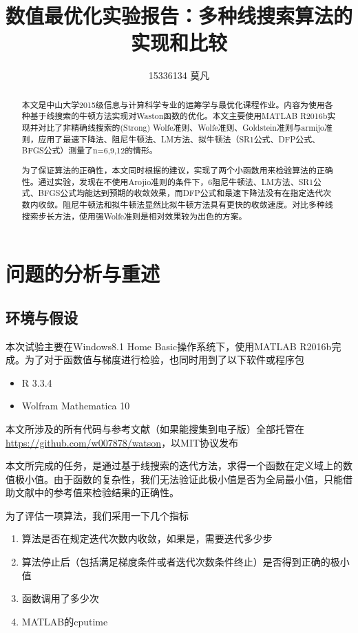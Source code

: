 \documentclass[11pt, a4paper]{article}
\begin{document}
\title{数值最优化实验报告：多种线搜索算法的实现和比较}
\author{15336134 莫凡}
\maketitle
\vspace{50pt}
\begin{abstract}
	本文是中山大学2015级信息与计算科学专业的运筹学与最优化课程作业\cite{高立2014数}。内容为使用各种基于线搜索的牛顿方法实现对Waston函数\cite{More:1981:TUO:355934.355936}的优化。本文主要使用MATLAB R2016b实现并对比了非精确线搜索的(Strong) Wolfe准则、Wolfe准则、Goldstein准则与armijo准则，应用了最速下降法、阻尼牛顿法、LM方法、拟牛顿法（SR1公式、DFP公式、BFGS公式）测量了n=6,9,12的情形。
	
	为了保证算法的正确性，本文同时根据\cite{More:1981:TUO:355934.355936}的建议，实现了两个小函数用来检验算法的正确性。通过实验，发现在不使用Arojio准则的条件下，6阻尼牛顿法、LM方法、SR1公式、BFGS公式均能达到预期的收敛效果，而DFP公式和最速下降法没有在指定迭代次数内收敛。阻尼牛顿法和拟牛顿法显然比拟牛顿方法具有更快的收敛速度。对比多种线搜索步长方法，使用强Wolfe准则是相对效果较为出色的方案。
\end{abstract}
\newpage
\tableofcontents
\newpage

\section{问题的分析与重述}

\subsection{环境与假设}
本次试验主要在Windows8.1 Home Basic操作系统下，使用MATLAB R2016b完成。为了对于函数值与梯度进行检验，也同时用到了以下软件或程序包
\begin{itemize}
	\item R 3.3.4
	\item Wolfram Mathematica 10
\end{itemize}

本文所涉及的所有代码与参考文献（如果能搜集到电子版）全部托管在 \url{https://github.com/w007878/watson}，以MIT协议发布

本文所完成的任务，是通过基于线搜索的迭代方法，求得一个函数在定义域上的数值极小值。由于函数的复杂性，我们无法验证此极小值是否为全局最小值，只能借助文献\cite{More:1981:TUO:355934.355936}中的参考值来检验结果的正确性。

为了评估一项算法，我们采用一下几个指标
\begin{enumerate}
	\item 算法是否在规定迭代次数内收敛，如果是，需要迭代多少步
	\item 算法停止后（包括满足梯度条件或者迭代次数条件终止）是否得到正确的极小值
	\item 函数调用了多少次
	\item MATLAB的cputime
\end{enumerate}
\end{document}
